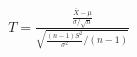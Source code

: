 \documentclass[preview]{standalone}
\begin{document}
\begin{align*}
T = \frac{\frac{\bar{X} - \mu}{\sigma / \sqrt{n}}}{\sqrt{\frac{(n-1)S^2}{\sigma^2} / (n-1)}}
\end{align*}
\end{document}
